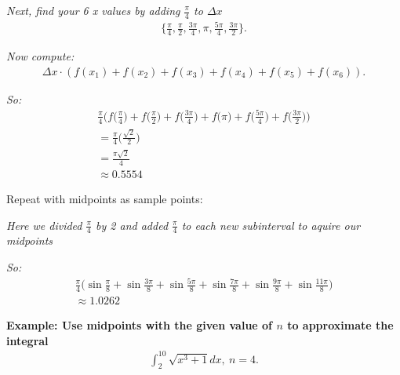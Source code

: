 \documentclass{report}
\begin{document}
\bigbreak \noindent 
\textit{Next, find your 6 x values by adding $\frac{\pi}{4}$ to $\Delta x$}
\begin{align*}
  \bigg\{\frac{\pi}{4}, \frac{\pi}{2}, \frac{3\pi}{4}, \pi, \frac{5\pi}{4}, \frac{3\pi}{2} \bigg\} 
.\end{align*}

\bigbreak \noindent 
\textit{Now compute:}
\begin{align*}
  \Delta x \cdot (f(x_{1}) + f(x_{2}) + f(x_{3}) + f(x_{4}) + f(x_{5}) + f(x_{6}))
.\end{align*}

\bigbreak \noindent
\textit{So:}
\begin{align*}
  \frac{\pi }{4}\bigg(f\bigg(\frac{\pi}{4}\bigg) + f\bigg(\frac{\pi}{2}\bigg) + f\bigg(\frac{3\pi}{4}\bigg) + f\bigg(\pi\bigg) + f\bigg(\frac{5\pi}{4}\bigg)+ f\bigg(\frac{3\pi}{2}\bigg)\bigg) \\
  = \frac{\pi }{4}\bigg(\frac{\sqrt{2}}{2}\bigg) \\
  = \frac{\pi \sqrt{2}}{4} \\
  \boxed{\approx 0.5554}
\end{align*}

\bigbreak \noindent 
Repeat with midpoints as sample points:

\bigbreak \noindent 
\bigbreak \noindent 
\begin{figure}[ht]
  \centering
  \label{fig:nmline}
\end{figure}

\bigbreak \noindent 
\textit{Here we divided $\frac{\pi}{4}$ by 2 and added $\frac{\pi }{4}$ to each new subinterval to aquire our midpoints}

\bigbreak \noindent 
{}

\bigbreak \noindent
\textit{So:}
\begin{align*}
  \frac{\pi}{4}\bigg(\sin{\frac{\pi}{8}} + \sin{\frac{3\pi}{8}} + \sin{\frac{5\pi}{8}} + \sin{\frac{7\pi}{8}} + \sin{\frac{9\pi}{8}} + \sin{\frac{11\pi}{8}}\bigg)  \\
  \boxed{\approx 1.0262}
\end{align*}

\bigbreak \noindent 
\begin{mdframed}
  \textbf{Example: Use midpoints with the given value of $n$ to approximate the integral}
  \begin{align*}
    \int_{2}^{10} \sqrt{x^{3} + 1}dx,\ n=4
  .\end{align*}
\end{mdframed}
\end{document}
